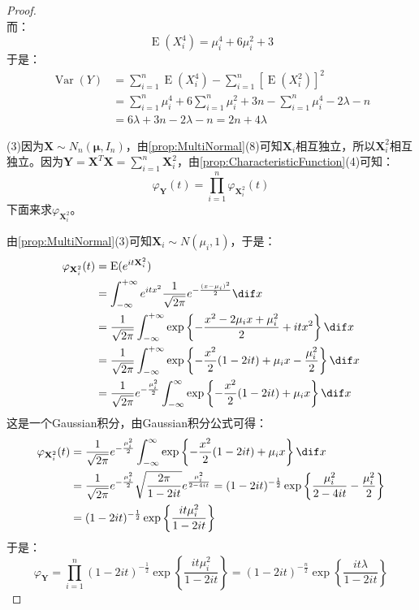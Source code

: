 \begin{proof}
\begin{equation*}
	\end{equation*}
	而：
	\begin{equation*}
		\operatorname{E}(X_i^4)=\mu_i^4+6\mu_i^2+3
	\end{equation*}
	于是：
	\begin{align*}
		\operatorname{Var}(Y)
		&=\sum_{i=1}^{n}\operatorname{E}(X_i^4)-\sum_{i=1}^{n}[\operatorname{E}(X_i^2)]^2 \\
		&=\sum_{i=1}^{n}\mu_i^4+6\sum_{i=1}^{n}\mu_i^2+3n-\sum_{i=1}^{n}\mu_i^4-2\lambda-n \\
		&=6\lambda+3n-2\lambda-n=2n+4\lambda
	\end{align*}\par
	(3)因为$\mathbf{X}\sim N_n(\boldsymbol{\mu},I_n)$，由\cref{prop:MultiNormal}(8)可知$\mathbf{X}_i$相互独立，所以$\mathbf{X}_i^2$相互独立。因为$\mathbf{Y}=\mathbf{X}^T\mathbf{X}=\sum\limits_{i=1}^n\mathbf{X}_i^2$，由\cref{prop:CharacteristicFunction}(4)可知：
	\begin{equation*}
		\varphi_{\mathbf{Y}}(t)=\prod_{i=1}^n\varphi_{\mathbf{X}_i^2}(t)
	\end{equation*}
	下面来求$\varphi_{\mathbf{X}_i^2}$。\par
	由\cref{prop:MultiNormal}(3)可知$\mathbf{X}_i\sim N(\mu_i,1)$，于是：
	\begin{align*}
		\varphi_{\mathbf{X}_i^2}(t)
		&=\operatorname{E}(e^{it\mathbf{X}_i^2}) \\
		&=\int_{-\infty}^{+\infty}e^{itx^2}\frac{1}{\sqrt{2\pi}}e^{-\frac{(x-\mu_i)^2}{2}}\dif x \\
		&=\frac{1}{\sqrt{2\pi}}\int_{-\infty}^{+\infty}\exp\left\{-\frac{x^2 - 2\mu_ix + \mu_i^2}{2} + itx^2\right\}\dif x \\
		&=\frac{1}{\sqrt{2\pi}}\int_{-\infty}^{+\infty}\exp\left\{-\frac{x^2}{2} (1 - 2it) + \mu_ix - \frac{\mu_i^2}{2}\right\}\dif x \\
		&=\frac{1}{\sqrt{2\pi}}e^{-\frac{\mu_i^2}{2}} \int_{-\infty}^{\infty} \exp\left\{-\frac{x^2}{2} (1 - 2it) + \mu_ix\right\}\dif x
	\end{align*}
	这是一个Gaussian积分，由Gaussian积分公式可得：
	\begin{align*}
		\varphi_{\mathbf{X}_i^2}(t)
		&=\frac{1}{\sqrt{2\pi}}e^{-\frac{\mu_i^2}{2}} \int_{-\infty}^{\infty}\exp\left\{-\frac{x^2}{2} (1 - 2it) + \mu_i x\right\}\dif x \\
		&=\frac{1}{\sqrt{2\pi}}e^{-\frac{\mu_i^2}{2}}\sqrt{\frac{2\pi}{1-2it}}e^{\frac{\mu_i^2}{2-4it}}
		=(1-2it)^{-\frac{1}{2}}\exp\left\{\frac{\mu_i^2}{2-4it}-\frac{\mu_i^2}{2}\right\} \\
		&=(1-2it)^{-\frac{1}{2}}\exp\left\{\frac{it\mu_i^2}{1-2it}\right\}
	\end{align*}
	于是：
	\begin{equation*}
		\varphi_{\mathbf{Y}}=\prod_{i=1}^n(1-2it)^{-\frac{1}{2}}\exp\left\{\frac{it\mu_i^2}{1-2it}\right\}=(1-2it)^{-\frac{n}{2}}\exp\left\{\frac{it\lambda}{1-2it}\right\}
	\end{equation*}
\end{proof}

